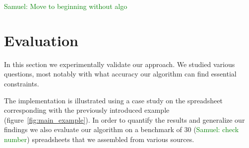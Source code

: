 \documentclass{ecai}
\newcommand{\sergey}[1]{\textcolor{magenta}{{\sc Sergey:} #1}\xspace}
\newcommand{\samuel}[1]{\textcolor{green}{{\sc Samuel:} #1}\xspace}
\newcommand{\constraints}{\ensuremath{\mathcal{C}}\xspace}
\newcommand{\format}[1]{\textit{#1}\xspace}
\newcommand{\extractgroups}{\format{extractGroups}}
\newcommand{\extracttables}{\format{extractTables}}
\newcommand{\learnconstraints}{\format{learnConstraints}}
\newcommand{\dependencies}{\ensuremath{\mathcal{D}}\xspace}
\begin{document}
\samuel{Move to beginning without algo}



\section{Evaluation}
In this section we experimentally validate our approach.
We studied various questions, most notably with what accuracy our algorithm can find essential constraints.

The implementation is illustrated using a case study on the spreadsheet corresponding with the previously introduced example (figure~\ref{fig:main_example}).
In order to quantify the results and generalize our findings we also evaluate our algorithm on a benchmark of 30 (\samuel{check number}) spreadsheets that we assembled from various sources.
\end{document}
